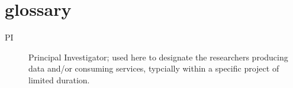 \section{glossary}
\label{app:glossary}

\begin{description}
\item[PI] Principal Investigator; used here to designate the researchers
producing data and/or consuming services, typcially within a specific
project of limited duration.

\end{description}
